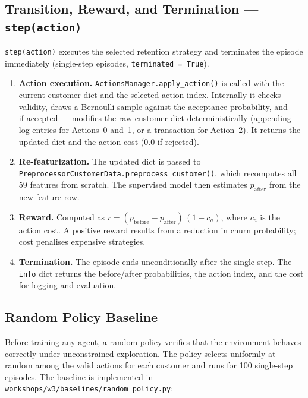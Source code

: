 \documentclass{article}
\begin{document}
\subsection{Transition, Reward, and Termination --- \texttt{step(action)}}

\texttt{step(action)} executes the selected retention strategy and terminates
the episode immediately (single-step episodes, \texttt{terminated = True}).

\begin{enumerate}
\item \textbf{Action execution.} \texttt{ActionsManager.apply\_action()} is called
with the current customer dict and the selected action index. Internally it
checks validity, draws a Bernoulli sample against the acceptance probability,
and — if accepted — modifies the raw customer dict deterministically
(appending log entries for Actions~0 and~1, or a transaction for Action~2).
It returns the updated dict and the action cost (0.0 if rejected).

\item \textbf{Re-featurization.} The updated dict is passed to
\texttt{PreprocessorCustomerData.preprocess\_customer()}, which recomputes
all 59 features from scratch. The supervised model then estimates
$p_{\text{after}}$ from the new feature row.

\item \textbf{Reward.} Computed as
$r = (p_{\text{before}} - p_{\text{after}})\,(1 - c_{a})$, where $c_{a}$
is the action cost. A positive reward results from a reduction in churn
probability; cost penalises expensive strategies.

\item \textbf{Termination.} The episode ends unconditionally after the single
step. The \texttt{info} dict returns the before/after probabilities, the
action index, and the cost for logging and evaluation.
\end{enumerate}

\subsection{Random Policy Baseline}
\label{sec:random}

Before training any agent, a random policy verifies that the environment behaves
correctly under unconstrained exploration. The policy selects uniformly at random
among the valid actions for each customer and runs for 100 single-step episodes.
The baseline is implemented in \texttt{workshops/w3/baselines/random\_policy.py}:
\end{document}
